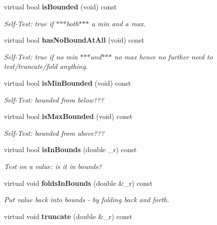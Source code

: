 \begin{CompactItemize}
\item 
virtual bool {\bf is\-Bounded} (void) const \label{classeo_int_above_bound_a7}

\begin{CompactList}\small\item\em Self-Test: true if $\ast$$\ast$$\ast$both$\ast$$\ast$$\ast$ a min and a max. \item\end{CompactList}\item 
virtual bool {\bf has\-No\-Bound\-At\-All} (void) const \label{classeo_int_above_bound_a8}

\begin{CompactList}\small\item\em Self-Test: true if no min $\ast$$\ast$$\ast$and$\ast$$\ast$$\ast$ no max hence no further need to test/truncate/fold anything. \item\end{CompactList}\item 
virtual bool {\bf is\-Min\-Bounded} (void) const \label{classeo_int_above_bound_a9}

\begin{CompactList}\small\item\em Self-Test: bounded from below??? \item\end{CompactList}\item 
virtual bool {\bf is\-Max\-Bounded} (void) const \label{classeo_int_above_bound_a10}

\begin{CompactList}\small\item\em Self-Test: bounded from above??? \item\end{CompactList}\item 
virtual bool {\bf is\-In\-Bounds} (double \_\-r) const \label{classeo_int_above_bound_a11}

\begin{CompactList}\small\item\em Test on a value: is it in bounds? \item\end{CompactList}\item 
virtual void {\bf folds\-In\-Bounds} (double \&\_\-r) const \label{classeo_int_above_bound_a12}

\begin{CompactList}\small\item\em Put value back into bounds - by folding back and forth. \item\end{CompactList}\item 
virtual void {\bf truncate} (double \&\_\-r) const \label{classeo_int_above_bound_a13}


\end{CompactItemize}
